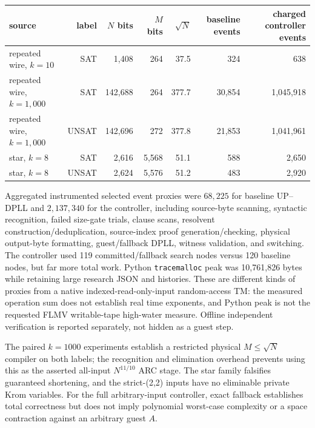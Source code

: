 \documentclass[11pt]{article}
\begin{document}
\begin{center}\small
\begin{tabular}{lrrrrrr}\toprule
source & label & $N$ bits & $M$ bits & $\sqrt N$ & baseline events & charged controller events\\\midrule
repeated wire, $k=10$ & SAT &1,408&264&37.5&324&638\\
repeated wire, $k=1{,}000$ & SAT &142,688&264&377.7&30,854&1,045,918\\
repeated wire, $k=1{,}000$ & UNSAT &142,696&272&377.8&21,853&1,041,961\\
star, $k=8$ & SAT &2,616&5,568&51.1&588&2,650\\
star, $k=8$ & UNSAT &2,624&5,576&51.2&483&2,920\\\bottomrule
\end{tabular}
\end{center}
Aggregated instrumented selected event proxies were $68{,}225$ for baseline UP--DPLL and $2{,}137{,}340$ for the controller, including source-byte scanning, syntactic recognition, failed size-gate trials, clause scans, resolvent construction/deduplication, source-index proof generation/checking, physical output-byte formatting, guest/fallback DPLL, witness validation, and switching. The controller used 119 committed/fallback search nodes versus 120 baseline nodes, but far more total work. Python \texttt{tracemalloc} peak was 10,761,826 bytes while retaining large research JSON and histories. These are different kinds of proxies from a native indexed-read-only-input random-access TM: the measured operation sum does not establish real time exponents, and Python peak is not the requested FLMV writable-tape high-water measure. Offline independent verification is reported separately, not hidden as a guest step.

The paired $k=1000$ experiments establish a restricted physical $M\le\sqrt N$ compiler on both labels; the recognition and elimination overhead prevents using this as the asserted all-input $N^{11/10}$ ARC stage. The star family falsifies guaranteed shortening, and the strict-(2,2) inputs have no eliminable private Krom variables. For the full arbitrary-input controller, exact fallback establishes total correctness but does not imply polynomial worst-case complexity or a space contraction against an arbitrary guest $A$.
\end{document}
